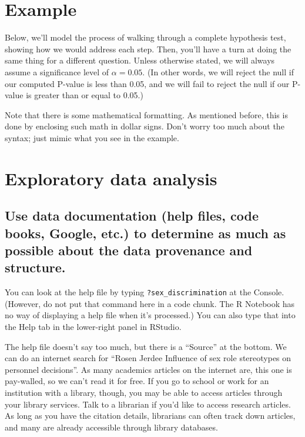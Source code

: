\documentclass[
]{book}
\begin{document}
\hypertarget{hypothesis1-example}{%
\section{Example}\label{hypothesis1-example}}

Below, we'll model the process of walking through a complete hypothesis test, showing how we would address each step. Then, you'll have a turn at doing the same thing for a different question. Unless otherwise stated, we will always assume a significance level of \(\alpha = 0.05\). (In other words, we will reject the null if our computed P-value is less than 0.05, and we will fail to reject the null if our P-value is greater than or equal to 0.05.)

Note that there is some mathematical formatting. As mentioned before, this is done by enclosing such math in dollar signs. Don't worry too much about the syntax; just mimic what you see in the example.

\hypertarget{hypothesis1-ex-eda}{%
\section{Exploratory data analysis}\label{hypothesis1-ex-eda}}

\hypertarget{hypothesis1-ex-documentation}{%
\subsection{Use data documentation (help files, code books, Google, etc.) to determine as much as possible about the data provenance and structure.}\label{hypothesis1-ex-documentation}}

You can look at the help file by typing \texttt{?sex\_discrimination} at the Console. (However, do not put that command here in a code chunk. The R Notebook has no way of displaying a help file when it's processed.) You can also type that into the Help tab in the lower-right panel in RStudio.

The help file doesn't say too much, but there is a ``Source'' at the bottom. We can do an internet search for ``Rosen Jerdee Influence of sex role stereotypes on personnel decisions''. As many academics articles on the internet are, this one is pay-walled, so we can't read it for free. If you go to school or work for an institution with a library, though, you may be able to access articles through your library services. Talk to a librarian if you'd like to access research articles. As long as you have the citation details, librarians can often track down articles, and many are already accessible through library databases.
\end{document}
